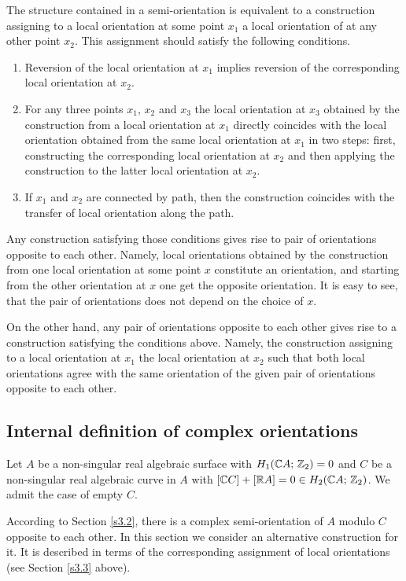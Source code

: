 \documentclass{article}
\numberwithin{equation}{section}
\begin{document}
The structure contained in a semi-orientation
is equivalent to a construction assigning to a local
orientation at some point $x_1$ a local orientation of
at any other point $x_2$. This assignment should satisfy
the following conditions. \begin{enumerate} 
\item Reversion of the local orientation at $x_1$ implies reversion of
the corresponding local orientation at $x_2$.
\item For any three points $x_1$, $x_2$ and $x_3$ the local orientation
at $x_3$ obtained by the construction from a local orientation at
$x_1$ directly coincides with the local orientation obtained from the
same local orientation at $x_1$ in two steps: first, constructing the
corresponding local orientation at $x_2$ and then applying the
construction to the latter local orientation at $x_2$.
\item If $x_1$ and $x_2$ are connected by path, then the construction
coincides with the transfer of local orientation along the path.
\end{enumerate}
Any construction satisfying those conditions gives rise to pair of
orientations opposite to each other. Namely, local orientations
obtained by the construction from one local orientation at some point
$x$ constitute an orientation, and starting from the other orientation
at $x$ one get the opposite orientation. It is easy to see, that the
pair of orientations does not depend on the choice of $x$.

On the other hand, any pair of orientations opposite to each other
gives rise to a construction satisfying the conditions above. Namely,
the construction assigning to a local orientation at $x_1$ the local
orientation at $x_2$ such that both local orientations agree with the
same orientation of the given pair of orientations opposite to each
other.

\subsection{Internal definition of complex orientations 
}\label{s3.4}
Let $A$ be a non-singular real algebraic
surface with $H_1(\mathbb C A;\,\mathbb Z_2)=0$ and $C$ be a non-singular real
algebraic curve in $A$ with $[\mathbb C C]+[\mathbb R A]=0\in H_2(\mathbb C A;\,\mathbb Z_2)$. We
admit the case of empty $C$.

According to Section \ref{s3.2}, there is a complex semi-orientation of
$A$ modulo $C$ opposite to each other. In this section we consider
an alternative construction for it. It is described
in terms of the corresponding assignment of local orientations (see
Section \ref{s3.3} above).
\end{document}
